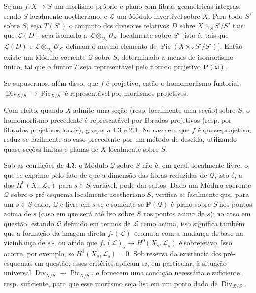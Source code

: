 Sejam $f:X\longrightarrow S$ um morfismo próprio e plano
com fibras geométricas íntegras, sendo $S$ localmente noetheriano, e
$\mathcal L$ um Módulo invertível sobre $X$. Para todo $S'$ sobre $S$, seja
$T(S')$ o conjunto dos divisores relativos $D$ sobre $X\times_SS'/S'$ tais que
$\mathcal L(D)$ seja isomorfo a
$\mathcal L\otimes_{\mathcal O_S}\mathcal O_{S'}$ localmente sobre $S'$ (isto
é, tais que $\mathcal L(D)$ e
$\mathcal L\otimes_{\mathcal O_S}\mathcal O_{S'}$ definam o mesmo elemento de
$\operatorname{Pic}(X\times_SS'/S')$). Então existe um Módulo coerente
$\mathcal Q$ sobre $S$, determinado a menos de isomorfismo único, tal que o
funtor $T$ seja representável pelo fibrado projetivo $\mathbf P(\mathcal Q)$.

 Se supusermos, além disso, que $f$ é projetivo, então o
homomorfismo funtorial
$\operatorname{Div}_{X/S}\longrightarrow\operatorname{Pic}_{X/S}$ é
representável por morfismos projetivos.

Com efeito, quando $X$ admite uma seção (resp. localmente uma seção) sobre $S$,
o homomorfismo precedente é representável por fibrados projetivos (resp. por
fibrados projetivos locais), graças a 4.3 e 2.1. No caso em que $f$ é
quase-projetivo, reduz-se facilmente ao caso precedente por um método de
descida, utilizando quase-seções finitas e planas de $X$ localmente sobre $S$.

 Sob as condições de 4.3, o Módulo $\mathcal Q$ sobre
$S$ não é, em geral, localmente livre, o que se exprime pelo fato de que a
dimensão das fibras reduzidas de $\mathcal Q$, isto é, a dos
$H^0(X_s,\mathcal L_s)$ para $s\in S$ variável, pode dar saltos. Dado um Módulo
coerente $\mathcal Q$ sobre o pré-esquema localmente noetheriano $S$, verifica-se
facilmente que, para um $s\in S$ dado, $\mathcal Q$ é livre em $s$ se e somente
se $\mathbf P(\mathcal Q)$ é plano sobre $S$ nos pontos acima de $s$ (caso em
que será até liso sobre $S$ nos pontos acima de $s$); no caso em questão,
estando $\mathcal Q$ definido em termos de $\mathcal L$ como acima, isso
significa também que a formação da imagem direta $f_*(\mathcal L)$ «comuta com
a mudança de base na
vizinhança de $s$», ou ainda que
$f_*(\mathcal L)_s\longrightarrow H^0(X_s,\mathcal L_s)$ é sobrejetivo. Isso
ocorre, por exemplo, se $H^1(X_s,\mathcal L_s)=0$. Sob reserva da existência
dos pré-esquemas em questão, esses critérios aplicam-se, em particular, à
situação universal
$\operatorname{Div}_{X/S}\longrightarrow\operatorname{Pic}_{X/S}$, e fornecem
uma condição necessária e suficiente, resp. suficiente, para que esse morfismo
seja liso em um ponto dado de $\operatorname{Div}_{X/S}$.

